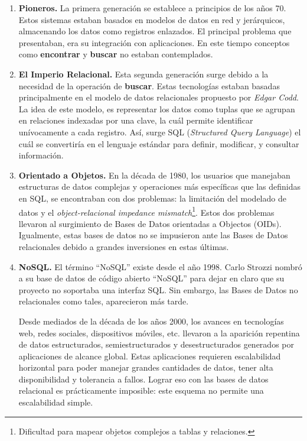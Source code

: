 \documentclass[pdflatex,sn-mathphys-num]{sn-jnl}
\theoremstyle{thmstyleone}%
\theoremstyle{thmstyletwo}%
\theoremstyle{thmstylethree}%
\begin{document}
\begin{enumerate}
    \item \textbf{Pioneros.} La primera generación se establece a principios de los años 70\cite{tbl}. Estos sistemas estaban basados en modelos de datos en red y jerárquicos, almacenando los datos como registros enlazados. El principal problema que presentaban, era su integración con aplicaciones. En este tiempo conceptos como \textbf{encontrar} y \textbf{buscar} no estaban contemplados.

    \item \textbf{El Imperio Relacional.} Esta segunda generación surge debido a la necesidad de la operación de \textbf{buscar}. Estas tecnologías estaban basadas principalmente en el modelo de datos relacionales propuesto por \textit{Edgar Codd}. La idea de este modelo, es representar los datos como tuplas que se agrupan en relaciones indexadas por una clave, la cuál permite identificar unívocamente a cada registro. Así, surge SQL (\textit{Structured Query Language}) el cuál se convertiría en el lenguaje estándar para definir, modificar, y consultar información.

    \item \textbf{Orientado a Objetos.} En la década de 1980, los usuarios que manejaban estructuras de datos complejas y operaciones más específicas que las definidas en SQL, se encontraban con dos problemas: la limitación del modelado de datos y el \textit{object-relacional impedance mismatch}\footnote{Dificultad para mapear objetos complejos a tablas y relaciones.}. Estos dos problemas llevaron al surgimiento de Bases de Datos orientadas a Objectos (OIDs). Igualmente, estas bases de datos no se impusieron ante las Bases de Datos relacionales debido a grandes inversiones en estas últimas.
    
    \item \textbf{NoSQL.} 
    El término ``NoSQL'' existe desde el año 1998. Carlo Strozzi nombró a su base de datos de código abierto ``NoSQL'' para dejar en claro que su proyecto no soportaba una interfaz SQL. Sin embargo, las Bases de Datos no relacionales como tales, aparecieron más tarde.
    
    Desde mediados de la década de los años 2000, los avances en tecnologías web, redes sociales, dispositivos móviles, etc. llevaron a la aparición repentina de datos estructurados, semiestructurados y desestructurados generados por aplicaciones de alcance global. Estas aplicaciones requieren escalabilidad horizontal para poder manejar grandes cantidades de datos, tener alta disponibilidad y tolerancia a fallos. Lograr eso con las bases de datos relacional es prácticamente imposible: este esquema no permite una escalabilidad simple. 


\end{enumerate}
\end{document}
